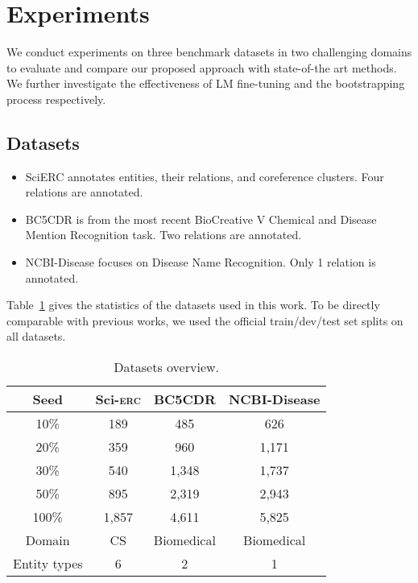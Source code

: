 \documentclass[10pt, conference, compsocconf]{IEEEtran}
\newcommand{\Scierc}{\textsc{S}ci-\textsc{erc}\xspace}
\begin{document}
\section{Experiments}
We conduct experiments on three benchmark
datasets in two challenging domains to evaluate and compare our proposed approach
with state-of-the art methods.  We further investigate the effectiveness of LM fine-tuning 
and the bootstrapping process respectively.




\subsection{Datasets}

\begin{itemize}
    \item SciERC\cite{luan-etal-2018-multi} annotates entities, 
    their relations, and coreference clusters. 
Four relations are annotated. 
    \item BC5CDR\cite{li2016biocreative} is from the most 
    recent BioCreative V Chemical and Disease Mention Recognition task. 
Two relations are annotated.
    \item NCBI-Disease\cite{dougan2014ncbi} focuses on Disease Name Recognition. 
Only 1 relation is annotated.
\end{itemize}
Table~\ref{tal:datasets} gives the statistics of the datasets used in this work. To be directly comparable with previous works, we
used the official train/dev/test set splits on all datasets.





\begin{table}[t!]
    \centering
\caption{Datasets overview.}
    \label{tal:datasets}
\begin{tabular}{c|ccc}
		\toprule
        Seed & \Scierc & BC5CDR  & NCBI-Disease \\
        \hline
        10\% & 189 & 485 & 626 \\
        20\% & 359 & 960 &  1,171\\
        30\% & 540 &  1,348 & 1,737\\
        50\% & 895 &  2,319 & 2,943\\
        100\% & 1,857&  4,611 & 5,825 \\
        \hline
        Domain & CS & Biomedical & Biomedical\\
        \hline
        Entity types & 6 & 2&  1\\
		\bottomrule
    \end{tabular}
\end{table}
\end{document}
